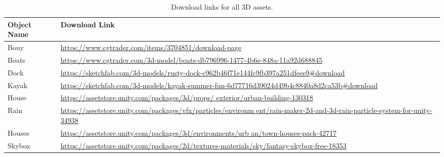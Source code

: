 \begin{table}[H]
\centering
\begin{tabularx}{\textwidth}{|l|X|}
\hline
\textbf{Object Name} & \textbf{Download Link} \\ 
\hline
Bouy            & \href{https://www.cgtrader.com/items/3704851/download-page}{https://www.cgtrader.com/items/3704851/download-page} \\ 
Boats               & \href{https://www.cgtrader.com/3d-model/boats-db796996-1477-4b6e-848a-11a92d688845}{https://www.cgtrader.com/3d-model/boats-db796996-1477-4b6e-848a-11a92d688845} \\ 
Dock                & \href{https://sketchfab.com/3d-models/rusty-dock-c962b46f71e144fc9fb397a251dfeee9\#download}{https://sketchfab.com/3d-models/rusty-dock-c962b46f71e144fc9fb397a251dfeee9\#download} \\ 
Kayak               & \href{https://sketchfab.com/3d-models/kayak-summer-fun-6d77716d39024d49b4c8840a8d2ca53b\#download}{https://sketchfab.com/3d-models/kayak-summer-fun-6d77716d39024d49b4c8840a8d2ca53b\#download} \\ 
House           & \href{https://assetstore.unity.com/packages/3d/props/exterior/urban-building-130318}{https://assetstore.unity.com/packages/3d/props/
exterior/urban-building-130318} \\ 
Rain            & \href{https://assetstore.unity.com/packages/vfx/particles/environment/rain-maker-2d-and-3d-rain-particle-system-for-unity-34938}{https://assetstore.unity.com/packages/vfx/particles/environm
ent/rain-maker-2d-and-3d-rain-particle-system-for-unity-34938} \\ 
Houses          & \href{https://assetstore.unity.com/packages/3d/environments/urban/town-houses-pack-42717}{https://assetstore.unity.com/packages/3d/environments/urb
an/town-houses-pack-42717} \\ 
Skybox          & \href{https://assetstore.unity.com/packages/2d/textures-materials/sky/fantasy-skybox-free-18353}{https://assetstore.unity.com/packages/2d/textures-materials/sky/fantasy-skybox-free-18353} \\ 
\hline
\end{tabularx}
\caption{Download links for all 3D assets.}
\label{tab:download_links}
\end{table}
